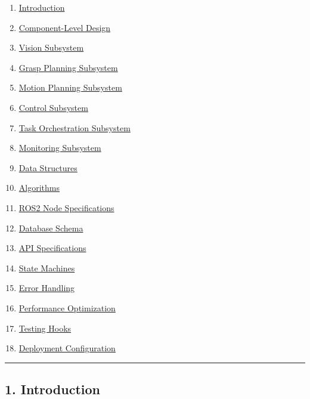 \documentclass[
]{article}
\providecommand{\tightlist}{%
  \setlength{\itemsep}{0pt}\setlength{\parskip}{0pt}}
\begin{document}
\begin{enumerate}
\def\labelenumi{\arabic{enumi}.}
\tightlist
\item
  \protect\hyperlink{1-introduction}{Introduction}
\item
  \protect\hyperlink{2-component-level-design}{Component-Level Design}
\item
  \protect\hyperlink{3-vision-subsystem}{Vision Subsystem}
\item
  \protect\hyperlink{4-grasp-planning-subsystem}{Grasp Planning
  Subsystem}
\item
  \protect\hyperlink{5-motion-planning-subsystem}{Motion Planning
  Subsystem}
\item
  \protect\hyperlink{6-control-subsystem}{Control Subsystem}
\item
  \protect\hyperlink{7-task-orchestration-subsystem}{Task Orchestration
  Subsystem}
\item
  \protect\hyperlink{8-monitoring-subsystem}{Monitoring Subsystem}
\item
  \protect\hyperlink{9-data-structures}{Data Structures}
\item
  \protect\hyperlink{10-algorithms}{Algorithms}
\item
  \protect\hyperlink{11-ros2-node-specifications}{ROS2 Node
  Specifications}
\item
  \protect\hyperlink{12-database-schema}{Database Schema}
\item
  \protect\hyperlink{13-api-specifications}{API Specifications}
\item
  \protect\hyperlink{14-state-machines}{State Machines}
\item
  \protect\hyperlink{15-error-handling}{Error Handling}
\item
  \protect\hyperlink{16-performance-optimization}{Performance
  Optimization}
\item
  \protect\hyperlink{17-testing-hooks}{Testing Hooks}
\item
  \protect\hyperlink{18-deployment-configuration}{Deployment
  Configuration}
\end{enumerate}

\begin{center}\rule{0.5\linewidth}{0.5pt}\end{center}

\hypertarget{introduction}{%
\subsection{1. Introduction}\label{introduction}}
\end{document}
